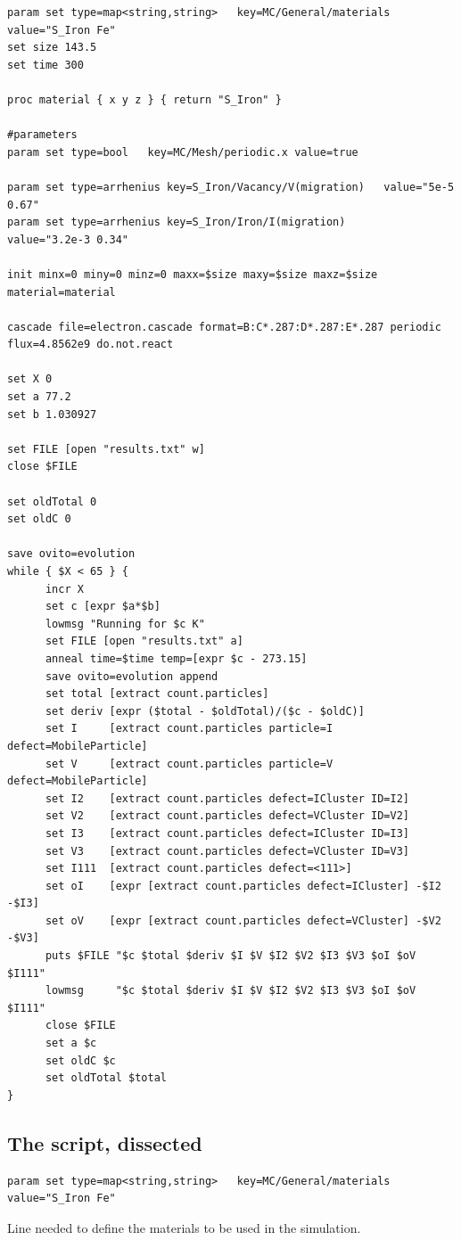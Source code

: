 \begin{lstlisting}
param set type=map<string,string>   key=MC/General/materials value="S_Iron Fe"
set size 143.5
set time 300

proc material { x y z } { return "S_Iron" }

#parameters
param set type=bool   key=MC/Mesh/periodic.x value=true

param set type=arrhenius key=S_Iron/Vacancy/V(migration)   value="5e-5 0.67"
param set type=arrhenius key=S_Iron/Iron/I(migration)      value="3.2e-3 0.34"

init minx=0 miny=0 minz=0 maxx=$size maxy=$size maxz=$size material=material

cascade file=electron.cascade format=B:C*.287:D*.287:E*.287 periodic flux=4.8562e9 do.not.react

set X 0
set a 77.2
set b 1.030927

set FILE [open "results.txt" w]
close $FILE

set oldTotal 0
set oldC 0

save ovito=evolution
while { $X < 65 } {
      incr X
      set c [expr $a*$b]
      lowmsg "Running for $c K"      
      set FILE [open "results.txt" a]
      anneal time=$time temp=[expr $c - 273.15]
      save ovito=evolution append
      set total [extract count.particles]
      set deriv [expr ($total - $oldTotal)/($c - $oldC)]
      set I     [extract count.particles particle=I defect=MobileParticle]
      set V     [extract count.particles particle=V defect=MobileParticle]
      set I2    [extract count.particles defect=ICluster ID=I2]
      set V2    [extract count.particles defect=VCluster ID=V2]
      set I3    [extract count.particles defect=ICluster ID=I3]
      set V3    [extract count.particles defect=VCluster ID=V3]
      set I111  [extract count.particles defect=<111>]
      set oI    [expr [extract count.particles defect=ICluster] -$I2 -$I3]
      set oV    [expr [extract count.particles defect=VCluster] -$V2 -$V3]
      puts $FILE "$c $total $deriv $I $V $I2 $V2 $I3 $V3 $oI $oV $I111"
      lowmsg     "$c $total $deriv $I $V $I2 $V2 $I3 $V3 $oI $oV $I111"
      close $FILE
      set a $c
      set oldC $c
      set oldTotal $total
}
\end{lstlisting}

\subsection{The script, dissected}

\begin{lstlisting}
param set type=map<string,string>   key=MC/General/materials value="S_Iron Fe"
\end{lstlisting}
Line needed to define the materials to be used in the simulation.

